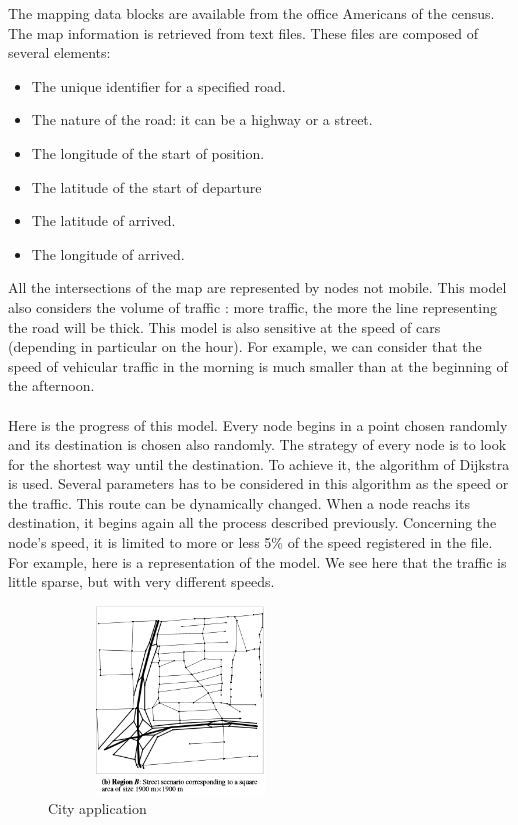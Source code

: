 The mapping data blocks are available from the office Americans of the census. The map information is retrieved from text files. These files are composed of several elements:

\begin{itemize}
\item The unique identifier for a specified road.
\item The nature of the road: it can be a highway or a street.
\item The longitude of the start of position.
\item The latitude of the start of departure
\item The latitude of arrived.
\item The longitude of arrived.
\end{itemize}

All the intersections of the map are represented by nodes not mobile.
This model also considers the volume of traffic : more traffic, the more the line representing the road will be thick.
This model is also sensitive at the speed of cars (depending in particular on the hour). For example, we can consider that the speed of vehicular traffic in the morning is much smaller than at the beginning of the afternoon.\\\\

Here is the progress of this model. Every node begins in a point chosen randomly and its destination is chosen also randomly. The strategy of every node is to look for the shortest way until the destination. To achieve it, the algorithm of Dijkstra is used. Several parameters has to be considered in this algorithm as the speed or the traffic. This route can be dynamically changed. When a node reachs its destination, it begins again all the process described previously. Concerning the node's speed, it is limited to more or less 5\% of the speed registered in the file.\\
For example, here is a representation of the model. We see here that the traffic is little sparse, but with very different speeds.

\begin{figure}[h]
\center
\includegraphics[width=7cm,height=50mm]{../images/city.png}
\caption{City application}
\end{figure}

